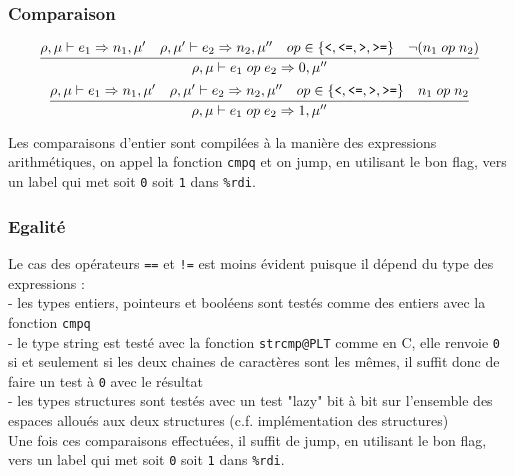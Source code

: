 \documentclass[11pt,a4paper]{article}
\begin{document}
\subsubsection{Comparaison}
\vspace{-1em}

$$\infer{\rho, \mu \vdash e_1 \; op \; e_2 \Rightarrow 0, \mu ''}{\rho, \mu \vdash e_1 \Rightarrow n_1, \mu ' & \rho, \mu ' \vdash e_2 \Rightarrow n_2, \mu '' & op \in \{\text{\texttt{<}}, \text{\texttt{<=}}, \text{\texttt{>}}, \text{\texttt{>=}}\} & \lnot (n_1 \; op \; n_2)}$$
$$\infer{\rho, \mu \vdash e_1 \; op \; e_2 \Rightarrow 1, \mu ''}{\rho, \mu \vdash e_1 \Rightarrow n_1, \mu ' & \rho, \mu ' \vdash e_2 \Rightarrow n_2, \mu '' & op \in \{\text{\texttt{<}}, \text{\texttt{<=}}, \text{\texttt{>}}, \text{\texttt{>=}}\} & n_1 \; op \; n_2}$$

Les comparaisons d'entier sont compilées à la manière des expressions arithmétiques, on appel la fonction \verb|cmpq| et on jump, en utilisant le bon flag, vers un label qui met soit \verb|0| soit \verb|1| dans \verb|%rdi|.

\subsubsection{Egalité}

Le cas des opérateurs \verb|==| et \verb|!=| est moins évident puisque il dépend du type des expressions :\\
 - les types entiers, pointeurs et booléens sont testés comme des entiers avec la fonction \verb|cmpq|\\
 - le type string est testé avec la fonction \verb|strcmp@PLT| comme en C, elle renvoie \verb|0| si et seulement si les deux chaines de caractères sont les mêmes, il suffit donc de faire un test à \verb|0| avec le résultat\\
 - les types structures sont testés avec un test "lazy" bit à bit sur l'ensemble des espaces alloués aux deux structures (c.f. implémentation des structures)\\

Une fois ces comparaisons effectuées, il suffit de jump, en utilisant le bon flag, vers un label qui met soit \verb|0| soit \verb|1| dans \verb|%rdi|.
\end{document}
